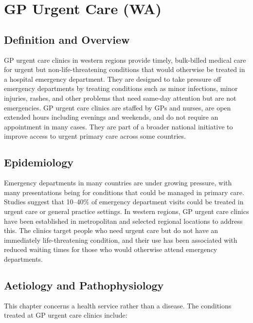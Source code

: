 \chapter{GP Urgent Care (WA)}

\section*{Definition and Overview}
GP urgent care clinics in western regions provide timely, bulk-billed medical care for urgent but non-life-threatening conditions that would otherwise be treated in a hospital emergency department. They are designed to take pressure off emergency departments by treating conditions such as minor infections, minor injuries, rashes, and other problems that need same-day attention but are not emergencies. GP urgent care clinics are staffed by GPs and nurses, are open extended hours including evenings and weekends, and do not require an appointment in many cases. They are part of a broader national initiative to improve access to urgent primary care across some countries.

\section*{Epidemiology}
Emergency departments in many countries are under growing pressure, with many presentations being for conditions that could be managed in primary care. Studies suggest that 10--40\% of emergency department visits could be treated in urgent care or general practice settings. In western regions, GP urgent care clinics have been established in metropolitan and selected regional locations to address this. The clinics target people who need urgent care but do not have an immediately life-threatening condition, and their use has been associated with reduced waiting times for those who would otherwise attend emergency departments.

\section*{Aetiology and Pathophysiology}
This chapter concerns a health service rather than a disease. The conditions treated at GP urgent care clinics include:

